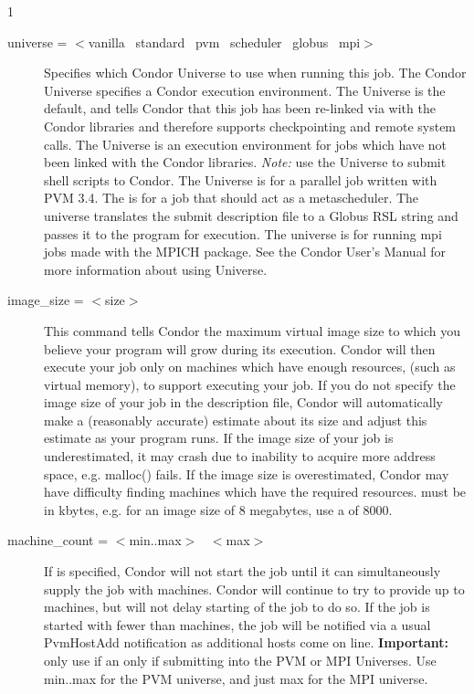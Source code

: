 \begin{ManPage}{\label{man-condor-submit}}{1}
\begin{description}

\item[universe = $<$vanilla \Bar\ standard \Bar\ pvm \Bar\ scheduler
\Bar\ globus \Bar\ mpi$>$] 
Specifies which Condor Universe to use when running this job.  The Condor 
Universe specifies a Condor execution environment.  The  
Universe is the default, and tells Condor that this job has been re-linked 
via  with the Condor libraries and therefore supports
checkpointing and remote system calls.  The  Universe is an
execution environment for jobs which have not been linked with the
Condor libraries.  \textit{Note:} use the  Universe to
submit shell scripts to Condor.  The  Universe is for a
parallel job written with PVM 3.4. The  is for a job that
should act as a metascheduler. The  universe translates the
submit description file to a Globus RSL string and passes it to 
the  program for execution.  The  universe is
for running mpi jobs made with the MPICH package.
See the Condor User's Manual for more information about using Universe.


\item[image\_size = $<$size$>$] This command tells Condor the maximum
virtual image size to which you believe your program will grow during
its execution. Condor will then execute your job only on machines which
have enough resources, (such as virtual memory), to support executing
your job. If you do not specify the image size of your job in the
description file, Condor will automatically make a (reasonably accurate)
estimate about its size and adjust this estimate as your program runs.
If the image size of your job is underestimated, it may crash due to
inability to acquire more address space, e.g. malloc() fails. If the image
size is overestimated, Condor may have difficulty finding machines which
have the required resources.  must be in kbytes, e.g. for
an image size of 8 megabytes, use a  of 8000.


\item[machine\_count = $<$min..max$>$ \Bar\ $<$max$>$] 
If  is
specified, Condor will not start the job until it can simultaneously
supply the job with  machines.  Condor will continue to try 
to provide up
to  machines, but will not delay starting of the job to do so.
If the job is started with fewer than  machines, the job
will be notified via a usual PvmHostAdd notification as additional
hosts come on line.
\textbf{Important:} only use  if an only if
submitting into the PVM or MPI Universes.  Use min..max for the PVM
universe, and just max for the MPI universe.


\end{description}
\end{ManPage}
